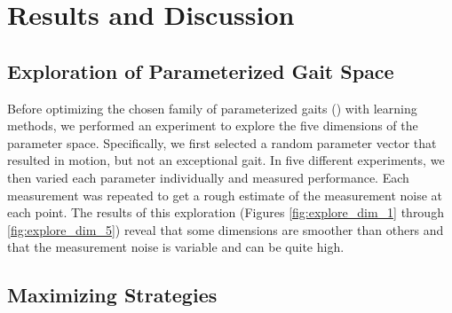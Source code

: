 \section{Results and Discussion}




\subsection{Exploration of Parameterized Gait Space}


Before optimizing the chosen family of
parameterized gaits () with learning methods, we performed an experiment to explore the five dimensions of the parameter space. Specifically, we first selected a random parameter vector that resulted
in motion, but not an exceptional gait. In five different experiments, we then varied each parameter
individually and measured performance.
Each measurement was repeated to get a rough estimate
of the measurement noise at each point.  The results
of this exploration (Figures \ref{fig:explore_dim_1} through
\ref{fig:explore_dim_5}) reveal that some dimensions
are smoother than others and that the measurement noise is variable and can be quite high. 




\subsection{Maximizing Strategies}



